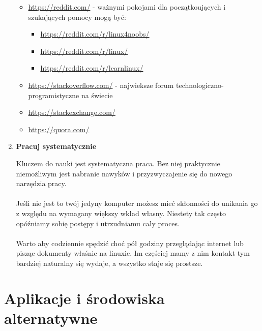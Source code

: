 \documentclass[10pt,a4paper]{report}
\begin{document}
\begin{enumerate}
\begin{itemize}
\item \url{https://reddit.com/} - ważnymi pokojami dla początkoujących i szukających pomocy mogą być:
\begin{itemize}
\item \url{https://reddit.com/r/linux4noobs/}
\item \url{https://reddit.com/r/linux/}
\item \url{https://reddit.com/r/learnlinux/}
\end{itemize}
\item \url{https://stackoverflow.com/} - najwieksze forum technologiczno-programistyczne na świecie
\item \url{https://stackexchange.com/}
\item \url{https://quora.com/}
\end{itemize}
\item \textbf{Pracuj systematycznie} \par Kluczem do nauki jest systematyczna praca. Bez niej praktycznie niemożliwym jest nabranie nawyków i przyzwyczajenie się do nowego narzędzia pracy. \\\\Jeśli nie jest to twój jedyny komputer możesz mieć skłonności do unikania go z względu na wymagany większy wkład własny. Niestety tak często opóźniamy sobię postępy i utrzudniamu cały proces. \\\\Warto aby codziennie spędzić choć pół godziny przeglądając internet lub pisząc dokumenty właśnie na linuxie. Im częściej mamy z nim kontakt tym bardziej naturalny się wydaje, a wszystko staje się prostsze.
\end{enumerate}


\chapter{Aplikacje i środowiska alternatywne}
\end{document}
